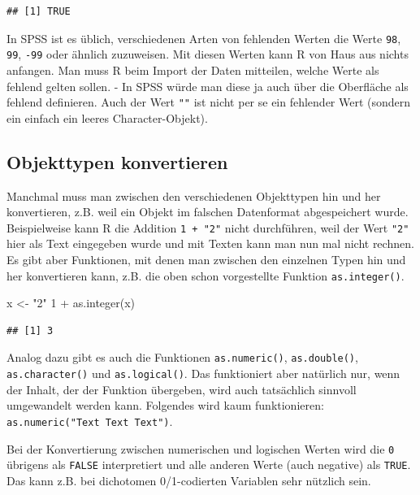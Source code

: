\documentclass[
]{book}
\newenvironment{Shaded}{\begin{snugshade}}{\end{snugshade}}
\newcommand{\DecValTok}[1]{\textcolor[rgb]{0.00,0.00,0.81}{#1}}
\newcommand{\FunctionTok}[1]{\textcolor[rgb]{0.00,0.00,0.00}{#1}}
\newcommand{\NormalTok}[1]{#1}
\newcommand{\OtherTok}[1]{\textcolor[rgb]{0.56,0.35,0.01}{#1}}
\newcommand{\SpecialCharTok}[1]{\textcolor[rgb]{0.00,0.00,0.00}{#1}}
\newcommand{\StringTok}[1]{\textcolor[rgb]{0.31,0.60,0.02}{#1}}
\begin{document}
\begin{verbatim}
## [1] TRUE
\end{verbatim}

In SPSS ist es üblich, verschiedenen Arten von fehlenden Werten die Werte \texttt{98}, \texttt{99}, \texttt{-99} oder ähnlich zuzuweisen. Mit diesen Werten kann R von Haus aus nichts anfangen. Man muss R beim Import der Daten mitteilen, welche Werte als fehlend gelten sollen. - In SPSS würde man diese ja auch über die Oberfläche als fehlend definieren. Auch der Wert \texttt{""} ist nicht per se ein fehlender Wert (sondern ein einfach ein leeres Character-Objekt).

\hypertarget{objekttypen-konvertieren}{%
\subsection{Objekttypen konvertieren}\label{objekttypen-konvertieren}}

Manchmal muss man zwischen den verschiedenen Objekttypen hin und her konvertieren, z.B. weil ein Objekt im falschen Datenformat abgespeichert wurde. Beispielweise kann R die Addition \texttt{1\ +\ "2"} nicht durchführen, weil der Wert \texttt{"2"} hier als Text eingegeben wurde und mit Texten kann man nun mal nicht rechnen. Es gibt aber Funktionen, mit denen man zwischen den einzelnen Typen hin und her konvertieren kann, z.B. die oben schon vorgestellte Funktion \texttt{as.integer()}.

\begin{Shaded}
\begin{Highlighting}[]
\NormalTok{x }\OtherTok{\textless{}{-}} \StringTok{"2"}
\DecValTok{1} \SpecialCharTok{+} \FunctionTok{as.integer}\NormalTok{(x)}
\end{Highlighting}
\end{Shaded}

\begin{verbatim}
## [1] 3
\end{verbatim}

Analog dazu gibt es auch die Funktionen \texttt{as.numeric()}, \texttt{as.double()}, \texttt{as.character()} und \texttt{as.logical()}. Das funktioniert aber natürlich nur, wenn der Inhalt, der der Funktion übergeben, wird auch tatsächlich sinnvoll umgewandelt werden kann. Folgendes wird kaum funktionieren: \texttt{as.numeric("Text\ Text\ Text")}.

Bei der Konvertierung zwischen numerischen und logischen Werten wird die \texttt{0} übrigens als \texttt{FALSE} interpretiert und alle anderen Werte (auch negative) als \texttt{TRUE}. Das kann z.B. bei dichotomen 0/1-codierten Variablen sehr nützlich sein.
\end{document}
